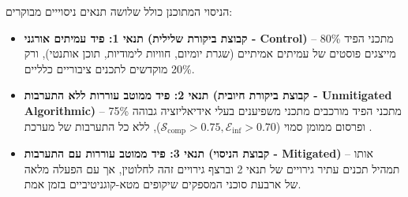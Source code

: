 הניסוי המתוכנן כולל שלושה תנאים ניסוייים מבוקרים:
\begin{itemize}
    \item \textbf{תנאי 1: פיד עמיתים אורגני (קבוצת ביקורת שלילית - Control)} -- 80\% מתכני הפיד מייצגים פוסטים של עמיתים אמיתיים (שגרת יומיום, חוויות לימודיות, תוכן אותנטי), ורק 20\% מוקדשים לתכנים ציבוריים כלליים.
    \item \textbf{תנאי 2: פיד ממוטב עוררות ללא התערבות (קבוצת ביקורת חיובית - Unmitigated Algorithmic)} -- 75\% מתכני הפיד מורכבים מתכני משפיענים בעלי אידיאליזציה גבוהה ופרסום ממומן סמוי ($\mathcal{S}_{\text{comp}} > 0.75, \mathcal{E}_{\text{inf}} > 0.70$), ללא כל התערבות של מערכת \projectname{}.
    \item \textbf{תנאי 3: פיד ממוטב עוררות עם התערבות \projectname{} (קבוצת הניסוי - Mitigated)} -- אותו תמהיל תכנים עתיר גירויים של תנאי 2 וברצף גירויים זהה לחלוטין, אך עם הפעלה מלאה של ארבעת סוכני \projectname{} המספקים שיקופים מטא-קוגניטיביים בזמן אמת.
\end{itemize}

